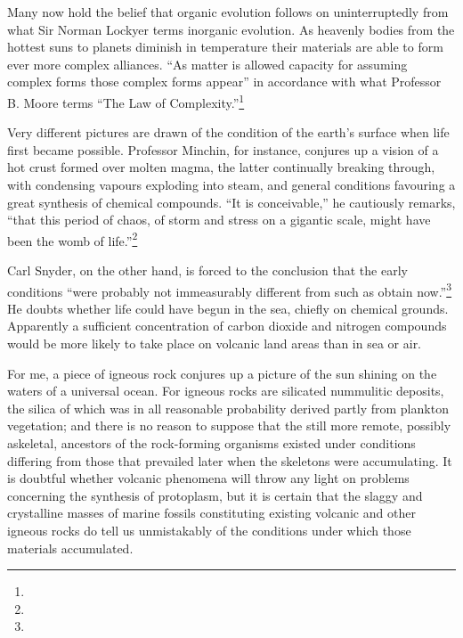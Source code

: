 \documentclass[a4paper, 12pt, oneside]{article}
\begin{document}
Many now hold the belief that organic evolution follows on uninterruptedly from what Sir Norman Lockyer terms inorganic evolution. As heavenly bodies from the hottest suns to planets diminish in temperature their materials are able to form ever more complex alliances. ``As matter is allowed capacity for assuming complex forms those complex forms appear'' in accordance with what Professor B. Moore terms ``The Law of Complexity.''\footnote{}

Very different pictures are drawn of the condition of the earth's surface when life first became possible. Professor Minchin, for instance, conjures up a vision of a hot crust formed over molten magma, the latter continually breaking through, with condensing vapours exploding into steam, and general conditions favouring a great synthesis of chemical compounds. ``It is conceivable,'' he cautiously remarks, ``that this period of chaos, of storm and stress on a gigantic scale, might have been the womb of life.''\footnote{}

Carl Snyder, on the other hand, is forced to the conclusion that the early conditions ``were probably not immeasurably different from such as obtain now.''\footnote{} He doubts whether life could have begun in the sea, chiefly on chemical grounds. Apparently a sufficient concentration of carbon dioxide and nitrogen compounds would be more likely to take place on volcanic land areas than in sea or air.

For me, a piece of igneous rock conjures up a picture of the sun shining on the waters of a universal ocean. For igneous rocks are silicated nummulitic deposits, the silica of which was in all reasonable probability derived partly from plankton vegetation; and there is no reason to suppose that the still more remote, possibly askeletal, ancestors of the rock-forming organisms existed under conditions differing from those that prevailed later when the skeletons were accumulating. It is doubtful whether volcanic phenomena will throw any light on problems concerning the synthesis of protoplasm, but it is certain that the slaggy and crystalline masses of marine fossils constituting existing volcanic and other igneous rocks do tell us unmistakably of the conditions under which those materials accumulated.
\end{document}
